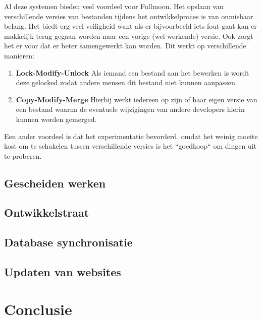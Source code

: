 \documentclass[12pt,a4paper]{article}
\begin{document}
    Al deze systemen bieden veel voordeel voor Fullmoon. Het opslaan van verschillende versies van bestanden tijdens het ontwikkelproces is van onmisbaar belang. Het biedt erg veel veiligheid want als er bijvoorbeeld iets fout gaat kan er makkelijk terug gegaan worden naar een vorige (wel werkende) versie. Ook zorgt het er voor dat er beter samengewerkt kan worden. Dit werkt op verschillende manieren:
    
    \begin{enumerate}
      \item \textbf{Lock-Modify-Unlock} Als iemand een bestand aan het bewerken is wordt deze gelocked zodat andere mensen dit bestand niet kunnen aanpassen.
      \item \textbf{Copy-Modify-Merge} Hierbij werkt iedereen op zijn of haar eigen versie van een bestand waarna de eventuele wijzigingen van andere developers hierin kunnen worden gemerged. 
    \end{enumerate}
    
     Een ander voordeel is dat het experimentatie bevorderd. omdat het weinig moeite kost om te schakelen tussen verschillende versies is het ``goedkoop`` om dingen uit te proberen.
    
    
  
    \subsection{Gescheiden werken}
    
    \subsection{Ontwikkelstraat}
    
    \subsection{Database synchronisatie}
    
    \subsection{Updaten van websites}
  
  
  
  
  \section{Conclusie}
\end{document}
